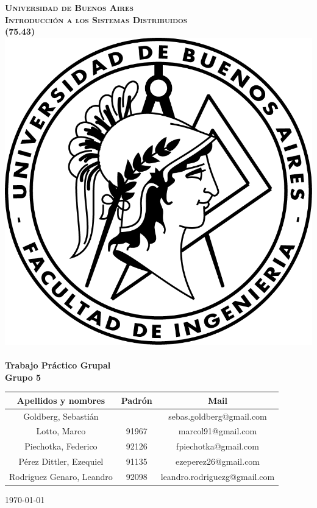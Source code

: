 \begin{titlepage}
\begin{center}


\textsc{\LARGE \textbf{Universidad de Buenos Aires}}\\%
\vfill
\textsc{\LARGE \textbf{Introducción a los Sistemas Distribuidos}}\\%
\vfill
\textsc{\LARGE \textbf{(75.43)}}\\%
\vfill
\vfill
\includegraphics[scale=1.25]{./logo.png}~\\[2cm]
{ \huge \bfseries Trabajo Práctico Grupal}\\%
\vfill
{ \huge \bfseries Grupo 5}\\%
\vfill
{\Large
\begin{tabular}{|c|c|c|}
\hline
Apellidos y nombres 		& Padrón	& 	Mail \\
\hline
Goldberg, Sebastián 			&  		& sebas.goldberg@gmail.com \\
\hline
Lotto, Marco 				& 91967 	& marcol91@gmail.com \\
\hline
Piechotka, Federico 			& 92126 	& fpiechotka@gmail.com \\
\hline
Pérez Dittler, Ezequiel 		& 91135 	& ezeperez26@gmail.com \\
\hline
Rodriguez Genaro, Leandro 		& 92098  	& leandro.rodriguezg@gmail.com \\
\hline
\end{tabular}
}
\vfill

{\large \today}

\end{center}
\end{titlepage}
